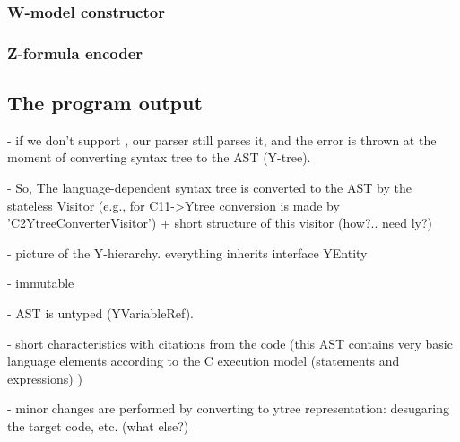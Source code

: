 \subsubsection{W-model constructor}
\label{ch:impl:proc:w-constr}

\subsubsection{Z-formula encoder}
\label{ch:impl:proc:z-encoder}



\subsection{The program output}
\label{ch:impl:out}



- if we don't support , our parser still parses it, and the error is thrown at the moment of converting syntax tree to the AST (Y-tree).

- So, The language-dependent syntax tree is converted to the AST by the stateless Visitor (e.g., for C11->Ytree conversion is made by 'C2YtreeConverterVisitor') + short structure of this visitor (how?.. need ly?)



- picture of the Y-hierarchy. everything inherits interface YEntity

- immutable

- AST is untyped (YVariableRef).

- short characteristics with citations from the code (this AST contains very basic language elements according to the C execution model (statements and expressions) )

- minor changes are performed by converting to ytree representation: desugaring the target code, etc. (what else?)



